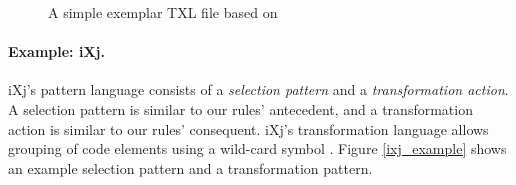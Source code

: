 \begin{figure}
\centering
{}
\caption{A simple exemplar TXL file based on~\cite{txltour}}
\label{fig:txl}
\end{figure}

\paragraph{\textbf{Example: iXj.}} 
iXj's pattern language consists of a {\em selection pattern} and a {\em transformation action}. A selection pattern is similar to our rules' antecedent, and a transformation action is similar to our rules' consequent. iXj's transformation language allows grouping of code elements using a wild-card symbol \codefont{*}. Figure \ref{ixj_example} shows an example selection pattern and a transformation pattern. 

